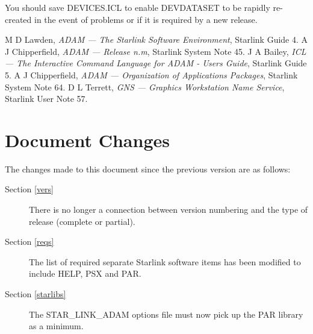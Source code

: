 You should save DEVICES.ICL to enable DEVDATASET to be rapidly re-created
in the event of problems or if it is required by a new release.

\begin{thebibliography}{9}
 M D Lawden, {\it ADAM --- The Starlink Software Environment},
Starlink Guide 4.
 A J Chipperfield, {\it ADAM --- Release n.m}, Starlink System
Note 45.
 J A Bailey, {\it ICL --- The Interactive Command Language for
ADAM - Users Guide}, Starlink Guide 5.
 A J Chipperfield, {\it ADAM --- Organization of Applications
Packages}, Starlink System Note 64.
 D L Terrett, {\it GNS --- Graphics Workstation Name Service},
Starlink User Note 57.
\end{thebibliography}

\newpage
\appendix
\section{Document Changes}
\label{changes}
The changes made to this document since the previous version are as follows:
\begin{description}
\item[Section \ref{vers}] There is no longer a connection between version
numbering and the type of release (complete or partial).
\item[Section \ref{reqs}] The list of required separate Starlink software items
has been modified to include HELP, PSX and PAR.
\item[Section \ref{starlibs}] The STAR\_LINK\_ADAM options file must now pick
up the PAR library as a minimum.
\end{description}

